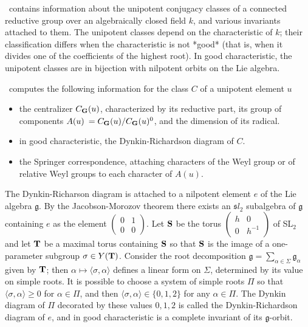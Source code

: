 \def\gg{{\mathfrak g}}
\def\Sym{{\mathfrak S}}
\def\gsl{{\mathfrak sl}}
\def\cB{{\mathcal B}}
\def\bG{{\bf G}}
\def\bS{{\bf S}}
\def\bT{{\bf T}}

\CHEVIE\  contains information about  the unipotent conjugacy  classes of a
connected  reductive  group  over  an  algebraically  closed field $k$, and
various  invariants attached to  them. The unipotent  classes depend on the
characteristic of $k$; their classification differs when the characteristic
is  not *good*  (that is,  when it  divides one  of the coefficients of the
highest  root).  In  good  characteristic,  the  unipotent  classes  are in
bijection with nilpotent orbits on the Lie algebra.

\CHEVIE\  computes  the  following  information  for  the  class  $C$  of a
unipotent element $u$\:
\begin{itemize}
\item  the centralizer $C_\bG(u)$, characterized by its reductive part, its
group  of components $A(u)\:=C_\bG(u)/C_\bG(u)^0$, and  the dimension of its
radical.
\item in good characteristic, the  Dynkin-Richardson  diagram of $C$.
\item  the Springer correspondence, attaching  characters of the Weyl group
or of relative Weyl groups to each character of $A(u)$.
\end{itemize}

The  Dynkin-Richarson diagram is attached to a nilpotent element $e$ of the
Lie algebra $\gg$. By the Jacobson-Morozov theorem there exists an $\gsl_2$
subalgebra of $\gg$ containing $e$ as the element
$\left(\begin{array}{cc}0&1\\0&0\end{array}\right)$. Let $\bS$ be the torus
$\left(\begin{array}{cc}h&0\\0&h^{-1}\end{array}\right)$  of SL$_2$ and let
$\bT$  be a maximal torus containing $\bS$ so  that $\bS$ is the image of a
one-parameter  subgroup $\sigma\in Y(\bT)$. Consider the root decomposition
$\gg=\sum_{\alpha\in\Sigma}\gg_\alpha$ given by $\bT$; then
$\alpha\mapsto\langle\sigma,\alpha\rangle$   defines   a   linear  form  on
$\Sigma$, determined by its value on simple roots. It is possible to choose
a  system of simple roots  $\Pi$ so that $\langle\sigma,\alpha\rangle\ge 0$
for  $\alpha\in\Pi$, and then $\langle\sigma,\alpha\rangle\in\{0,1,2\}$ for
any  $\alpha\in\Pi$. The Dynkin diagram of  $\Pi$ decorated by these values
$0,1,2$  is  called  the  Dynkin-Richardson  diagram  of  $e$,  and in good
characteristic is a complete invariant of its $\gg$-orbit.

